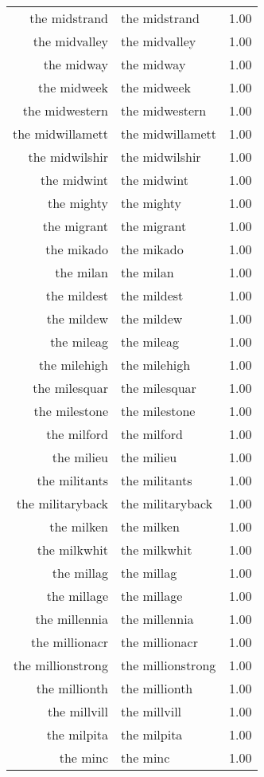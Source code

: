 \begin{table}[ht]
\begin{tabular}{rlr}
  the midstrand & the midstrand & 1.00 \\ 
  the midvalley & the midvalley & 1.00 \\ 
  the midway & the midway & 1.00 \\ 
  the midweek & the midweek & 1.00 \\ 
  the midwestern & the midwestern & 1.00 \\ 
  the midwillamett & the midwillamett & 1.00 \\ 
  the midwilshir & the midwilshir & 1.00 \\ 
  the midwint & the midwint & 1.00 \\ 
  the mighty & the mighty & 1.00 \\ 
  the migrant & the migrant & 1.00 \\ 
  the mikado & the mikado & 1.00 \\ 
  the milan & the milan & 1.00 \\ 
  the mildest & the mildest & 1.00 \\ 
  the mildew & the mildew & 1.00 \\ 
  the mileag & the mileag & 1.00 \\ 
  the milehigh & the milehigh & 1.00 \\ 
  the milesquar & the milesquar & 1.00 \\ 
  the milestone & the milestone & 1.00 \\ 
  the milford & the milford & 1.00 \\ 
  the milieu & the milieu & 1.00 \\ 
  the militants & the militants & 1.00 \\ 
  the militaryback & the militaryback & 1.00 \\ 
  the milken & the milken & 1.00 \\ 
  the milkwhit & the milkwhit & 1.00 \\ 
  the millag & the millag & 1.00 \\ 
  the millage & the millage & 1.00 \\ 
  the millennia & the millennia & 1.00 \\ 
  the millionacr & the millionacr & 1.00 \\ 
  the millionstrong & the millionstrong & 1.00 \\ 
  the millionth & the millionth & 1.00 \\ 
  the millvill & the millvill & 1.00 \\ 
  the milpita & the milpita & 1.00 \\ 
  the minc & the minc & 1.00 \\ 

\end{tabular}
\end{table}
